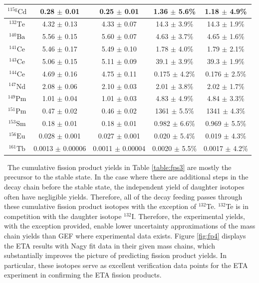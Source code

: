 \begin{table}[htb!]
{\begin{tabular}{|c|c|c|c|c|}
$\mathrm{^{115g}Cd}$ & 0.28 $\pm$ 0.01 & 0.25 $\pm$ 0.01 & 1.36 $\pm$ 5.6\% & 1.18 $\pm$ 4.9\% \\ \hline
$\mathrm{^{132}Te}$ & 4.32 $\pm$ 0.13 & 4.33 $\pm$ 0.07 & 14.3 $\pm$ 3.9\% & 14.3 $\pm$ 1.9\% \\ \hline
$\mathrm{^{140}Ba}$ & 5.56 $\pm$ 0.15 & 5.60 $\pm$ 0.07 & 4.63 $\pm$ 3.7\% & 4.65 $\pm$ 1.6\% \\ \hline
$\mathrm{^{141}Ce}$ & 5.46 $\pm$ 0.17 & 5.49 $\pm$ 0.10 & 1.78 $\pm$ 4.0\% & 1.79 $\pm$ 2.1\% \\ \hline
$\mathrm{^{143}Ce}$ & 5.06 $\pm$ 0.15 & 5.11 $\pm$ 0.09 & 39.1 $\pm$ 3.9\% & 39.3 $\pm$ 1.9\% \\  \hline
$\mathrm{^{144}Ce}$ & 4.69 $\pm$ 0.16 & 4.75 $\pm$ 0.11 & 0.175 $\pm$ 4.2\% & 0.176 $\pm$ 2.5\% \\ \hline
$\mathrm{^{147}Nd}$ & 2.08 $\pm$ 0.06 & 2.10 $\pm$ 0.03 & 2.01 $\pm$ 3.8\% & 2.02 $\pm$ 1.7\% \\ \hline
$\mathrm{^{149}Pm}$ & 1.01 $\pm$ 0.04 & 1.01 $\pm$ 0.03 & 4.83 $\pm$ 4.9\% & 4.84 $\pm$ 3.3\% \\ \hline
$\mathrm{^{151}Pm}$ & 0.47 $\pm$ 0.02 & 0.46 $\pm$ 0.02 & 1361 $\pm$ 5.5\% & 1341 $\pm$ 4.3\% \\ \hline
$\mathrm{^{153}Sm}$ & 0.18 $\pm$ 0.01 & 0.18 $\pm$ 0.01 & 0.982 $\pm$ 6.6\% & 0.969 $\pm$ 5.5\% \\ \hline
$\mathrm{^{156}Eu}$ & 0.028 $\pm$ 0.001 & 0.027 $\pm$ 0.001 & 0.020 $\pm$ 5.4\% & 0.019 $\pm$ 4.3\% \\ \hline
$\mathrm{^{161}Tb}$ & 0.0013 $\pm$ 0.00006 & 0.0011 $\pm$ 0.00004 & 0.0020 $\pm$ 5.5\% & 0.0017 $\pm$ 4.2\% \\ \hline
		\end{tabular}%
	}
\end{table}

\ The cumulative fission product yields in Table \ref{table:fps3} are mostly the precursor to the stable state. 
In the case where there are additional steps in the decay chain before the stable state, the independent yield of daughter isotopes often have negligible yields.
Therefore, all of the decay feeding passes through these cumulative fission product isotopes with the exception of $\mathrm{^{132}}$Te. 
$\mathrm{^{132}}$Te is in competition with the daughter isotope $\mathrm{^{132}}$I. 
Therefore, the experimental yields, with the exception provided, enable lower uncertainty approximations of the mass chain yields than GEF where experimental data exists. 
Figure \ref{fig:fp4} displays the ETA results with Nagy fit data in their given mass chains, which substantially improves the picture of predicting fission product yields. 
In particular, these isotopes serve as excellent verification data points for the ETA experiment in confirming the ETA fission products. 

